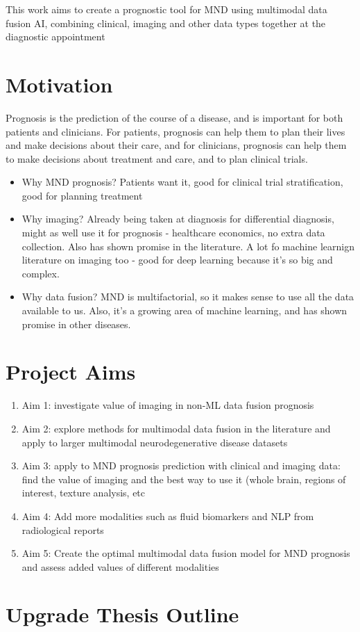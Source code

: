 This work aims to create a prognostic tool for MND using multimodal data fusion AI, combining clinical, imaging and other data types together at the diagnostic appointment


\section{Motivation}

Prognosis is the prediction of the course of a disease, and is important for both patients and clinicians.
For patients, prognosis can help them to plan their lives and make decisions about their care, and for clinicians, prognosis can help them to make decisions about treatment and care, and to plan clinical trials.

\begin{itemize}
    \item Why MND prognosis? Patients want it, good for clinical trial stratification, good for planning treatment
    \item Why imaging? Already being taken at diagnosis for differential diagnosis, might as well use it for prognosis - healthcare economics, no extra data collection. Also has shown promise in the literature. A lot fo machine learnign literature on imaging too - good for deep learning because it's so big and complex.
    \item Why data fusion? MND is multifactorial, so it makes sense to use all the data available to us. Also, it's a growing area of machine learning, and has shown promise in other diseases.
\end{itemize}

\section{Project Aims}

\begin{enumerate}
    \item Aim 1: investigate value of imaging in non-ML data fusion prognosis
    \item Aim 2: explore methods for multimodal data fusion in the literature and apply to larger multimodal neurodegenerative disease datasets
    \item Aim 3: apply to MND prognosis prediction with clinical and imaging data: find the value of imaging and the best way to use it (whole brain, regions of interest, texture analysis, etc
    \item Aim 4: Add more modalities such as fluid biomarkers and NLP from radiological reports
    \item Aim 5: Create the optimal multimodal data fusion model for MND prognosis and assess added values of different modalities
\end{enumerate}

\section{Upgrade Thesis Outline}